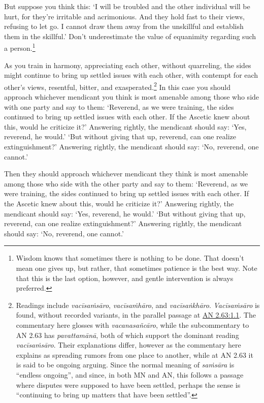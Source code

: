 \documentclass[12pt,openany]{book}%
\begin{document}
But suppose you think this: ‘I will be troubled and the other individual will be hurt, for they’re irritable and acrimonious. And they hold fast to their views, refusing to let go. I cannot draw them away from the unskillful and establish them in the skillful.’ Don’t underestimate the value of equanimity regarding such a person.\footnote{Wisdom knows that sometimes there is nothing to be done. That doesn’t mean one gives up, but rather, that sometimes patience is the best way. Note that this is the last option, however, and gentle intervention is always preferred. } 

As you train in harmony, appreciating each other, without quarreling, the sides might continue to bring up settled issues with each other, with contempt for each other’s views, resentful, bitter, and exasperated.\footnote{Readings include \textit{\textsanskrit{vacīsaṁsāro}}, \textit{\textsanskrit{vacīsaṁhāro}}, and \textit{\textsanskrit{vacīsaṅkhāro}}. \textit{\textsanskrit{Vacīsaṁsāro}} is found, without recorded variants, in the parallel passage at \href{https://suttacentral.net/an2.63/en/sujato\#1.1}{AN 2.63:1.1}. The commentary here glosses with \textit{\textsanskrit{vacanasañcāro}}, while the subcommentary to AN 2.63 has \textit{\textsanskrit{pavattamānā}}, both of which support the dominant reading \textit{\textsanskrit{vacīsaṁsāro}}. Their explanations differ, however as the commentary here explains as spreading rumors from one place to another, while at AN 2.63 it is said to be ongoing arguing. Since the normal meaning of \textit{\textsanskrit{saṁsāra}} is “endless ongoing”, and since, in both MN and AN, this follows a passage where disputes were supposed to have been settled, perhaps the sense is “continuing to bring up matters that have been settled”. } In this case you should approach whichever mendicant you think is most amenable among those who side with one party and say to them: ‘Reverend, as we were training, the sides continued to bring up settled issues with each other. If the Ascetic knew about this, would he criticize it?’ Answering rightly, the mendicant should say: ‘Yes, reverend, he would.’ ‘But without giving that up, reverend, can one realize extinguishment?’ Answering rightly, the mendicant should say: ‘No, reverend, one cannot.’ 

Then they should approach whichever mendicant they think is most amenable among those who side with the other party and say to them: ‘Reverend, as we were training, the sides continued to bring up settled issues with each other. If the Ascetic knew about this, would he criticize it?’ Answering rightly, the mendicant should say: ‘Yes, reverend, he would.’ ‘But without giving that up, reverend, can one realize extinguishment?’ Answering rightly, the mendicant should say: ‘No, reverend, one cannot.’ 
\end{document}
